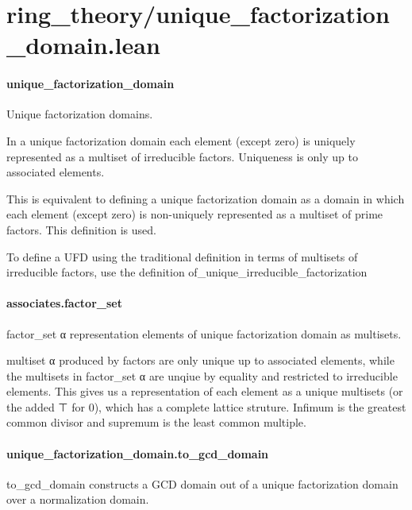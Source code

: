 \documentclass{article}
\begin{document}
\section{ring\_theory/unique\_factorization\_domain.lean}\paragraph{unique\_factorization\_domain}
\par
Unique factorization domains.
\par
In a unique factorization domain each element (except zero) is uniquely
represented as a multiset of irreducible factors.
Uniqueness is only up to associated elements.
\par
This is equivalent to defining a unique factorization domain as a domain in
which each element (except zero) is non-uniquely represented as a multiset
of prime factors. This definition is used.
\par
To define a UFD using the traditional definition in terms of multisets
of irreducible factors, use the definition 
\colorbox[RGB]{253,246,227}{{{{\color[RGB]{101, 123, 131} of\_unique\_irreducible\_factorization }}}}\paragraph{associates.factor\_set}
\par
\colorbox[RGB]{253,246,227}{{{{\color[RGB]{101, 123, 131} factor\_set α }}}} representation elements of unique factorization domain as multisets.
\par
\colorbox[RGB]{253,246,227}{{{{\color[RGB]{101, 123, 131} multiset α }}}} produced by 
\colorbox[RGB]{253,246,227}{{{{\color[RGB]{101, 123, 131} factors }}}} are only unique up to associated elements, while the multisets in
\colorbox[RGB]{253,246,227}{{{{\color[RGB]{101, 123, 131} factor\_set α }}}} are unqiue by equality and restricted to irreducible elements. This gives us a
representation of each element as a unique multisets (or the added ⊤ for 0), which has a complete
lattice struture. Infimum is the greatest common divisor and supremum is the least common multiple.
\paragraph{unique\_factorization\_domain.to\_gcd\_domain}
\par
\colorbox[RGB]{253,246,227}{{{{\color[RGB]{101, 123, 131} to\_gcd\_domain }}}} constructs a GCD domain out of a unique factorization domain over a normalization
domain.
\end{document}
